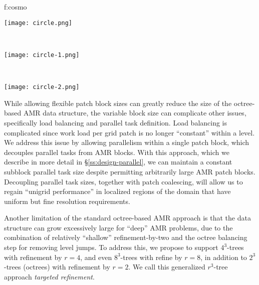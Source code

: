 \documentclass[11pt,letterpaper]{article}
\begin{document}
 {f:cosmo}{
\begin{minipage}{\textwidth}
\begin{center}
\begin{minipage}{2.0in}
\texttt{[image: circle.png]}
\end{minipage} \ 
\begin{minipage}{2.0in}
\texttt{[image: circle-1.png]}
\end{minipage} \ 
\begin{minipage}{2.0in}
\texttt{[image: circle-2.png]}
\end{minipage}
\end{center}
\end{minipage}
}

While allowing flexible patch block sizes can greatly reduce the size
of the octree-based AMR data structure, the variable block size can
complicate other issues, specifically load balancing and parallel task
definition.  Load balancing is complicated since work load per grid
patch is no longer ``constant'' within a level.  We address this issue
by allowing parallelism within a single patch block, which decouples
parallel tasks from AMR blocks.  With this approach, which we describe
in more detail in \S\ref{ss:design-parallel}, we can maintain a
constant subblock parallel task size despite permitting arbitrarily
large AMR patch blocks.  Decoupling parallel task sizes, together with
patch coalescing, will allow us to regain ``unigrid performance'' in
localized regions of the domain that have uniform but fine resolution
requirements.


\SUBSUBSECTION{Targeted refinement}
%
Another limitation of the standard octree-based AMR approach is that
the data structure can grow excessively large for ``deep'' AMR
problems, due to the combination of relatively ``shallow''
refinement-by-two and the octree balancing step for removing level
jumps.  To address this, we propose to support $4^3$-trees with
refinement by $r=4$, and even $8^3$-trees with refine by $r=8$, in
addition to $2^3$-trees (octrees) with refinement by $r=2$.  We call
this generalized $r^3$-tree approach \textit{targeted refinement}.
\end{document}
